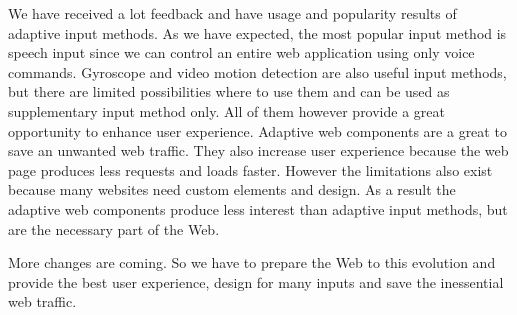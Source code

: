 \documentclass{iitsrc}
\begin{document}

We have received a lot feedback and have usage and popularity results of adaptive input methods. As we have expected, the most popular input method is speech input since we can control an entire web application using only voice commands. Gyroscope and video motion detection are also useful input methods, but there are limited possibilities where to use them and can be used as supplementary input method only. All of them however provide a great opportunity to enhance user experience. Adaptive web components are a great to save an unwanted web traffic. They also increase user experience because the web page produces less requests and loads faster. However the limitations also exist because many websites need custom elements and design. As a result the adaptive web components produce less interest than adaptive input methods, but are the necessary part of the Web.

More changes are coming. So we have to prepare the Web to this evolution and provide the best user experience, design for many inputs and save the inessential web traffic.



\end{document}
